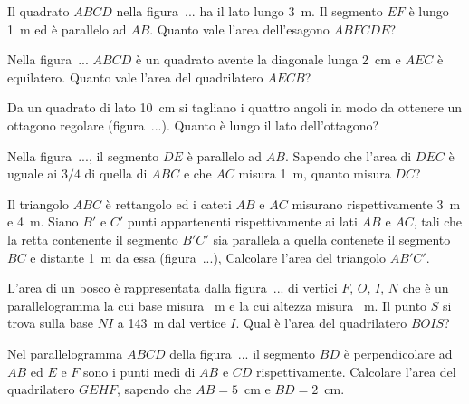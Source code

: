 \begin{multicols}{2}
\begin{esercizio}
\label{ese:7.104}
Il quadrato $ABCD$ nella figura~... ha il lato lungo 3~m. Il segmento $EF$ è lungo 1~m ed è parallelo ad $AB$. Quanto vale l'area dell'esagono $ABFCDE$?
\end{esercizio}

\begin{esercizio}
\label{ese:7.105}
Nella figura~... $ABCD$ è un quadrato avente la diagonale lunga 2~cm e $AEC$ è equilatero. Quanto vale l'area del quadrilatero $AECB$?
\end{esercizio}

\begin{esercizio}
\label{ese:7.106}
Da un quadrato di lato 10~cm si tagliano i quattro angoli in modo da ottenere un ottagono regolare (figura~...). Quanto è lungo il lato dell'ottagono?
\end{esercizio}

\begin{esercizio}
\label{ese:7.107}
Nella figura~..., il segmento $DE$ è parallelo ad $AB$. Sapendo che l'area di $DEC$ è uguale ai $3/4$ di quella di $ABC$ e che $AC$ misura 1~m, quanto misura $DC$?
\end{esercizio}

\begin{esercizio}
\label{ese:7.108}
Il triangolo $ABC$ è rettangolo ed i cateti $AB$ e $AC$ misurano rispettivamente 3~m e 4~m. Siano $B'$ e $C'$ punti appartenenti rispettivamente ai lati $AB$ e $AC$, tali che la retta contenente il segmento $B'C'$ sia parallela a quella contenete il segmento $BC$ e distante 1~m da essa (figura~...), Calcolare l'area del triangolo $AB'C'$.
\end{esercizio}

\begin{esercizio}
\label{ese:7.109}
L'area di un bosco è rappresentata dalla figura~... di vertici $F$, $O$, $I$, $N$ che è un parallelogramma la cui base misura ~m e la cui altezza misura ~m. Il punto $S$ si trova sulla base $NI$ a 143~m dal vertice $I$. Qual è l'area del quadrilatero $BOIS$?
\end{esercizio}

\begin{esercizio}
\label{ese:7.110}
Nel parallelogramma $ABCD$ della figura~... il segmento $BD$ è perpendicolare ad $AB$ ed $E$ e $F$ sono i punti medi di $AB$ e $CD$ rispettivamente. Calcolare l'area del quadrilatero $GEHF$, sapendo che $AB=5$~cm e $BD=2$~cm.
\end{esercizio}


\end{multicols}
